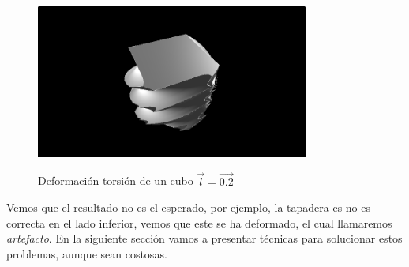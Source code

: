 \begin{figure}[H]
  \centering
  \captionsetup{justification=centering}%
  \includegraphics[width=0.8\textwidth]{secciones/imagenes/sdf/3d/sdf_twist.png}\label{fig:twist}
  \caption{Deformación torsión de un cubo \(\Vec{l}=\Vec{0.2}\)}
\end{figure}

Vemos que el resultado no es el esperado, por ejemplo, la tapadera es no es correcta en el lado inferior, vemos que este se ha deformado, el cual llamaremos \textit{artefacto}. En la siguiente sección vamos a presentar técnicas para solucionar estos problemas, aunque sean costosas.